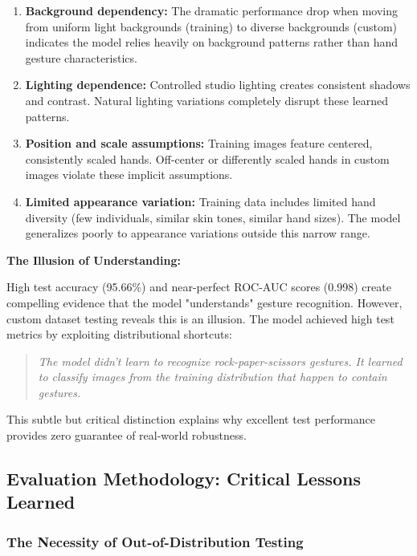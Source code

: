 \documentclass[12pt,a4paper]{article}
\begin{document}
\begin{enumerate}
    \item \textbf{Background dependency:} The dramatic performance drop when moving from uniform light backgrounds (training) to diverse backgrounds (custom) indicates the model relies heavily on background patterns rather than hand gesture characteristics.
    
    \item \textbf{Lighting dependence:} Controlled studio lighting creates consistent shadows and contrast. Natural lighting variations completely disrupt these learned patterns.
    
    \item \textbf{Position and scale assumptions:} Training images feature centered, consistently scaled hands. Off-center or differently scaled hands in custom images violate these implicit assumptions.
    
    \item \textbf{Limited appearance variation:} Training data includes limited hand diversity (few individuals, similar skin tones, similar hand sizes). The model generalizes poorly to appearance variations outside this narrow range.
\end{enumerate}

\textbf{The Illusion of Understanding:}

High test accuracy (95.66\%) and near-perfect ROC-AUC scores (0.998) create compelling evidence that the model "understands" gesture recognition. However, custom dataset testing reveals this is an illusion. The model achieved high test metrics by exploiting distributional shortcuts:

\begin{quotation}
\textit{The model didn't learn to recognize rock-paper-scissors gestures. It learned to classify images from the training distribution that happen to contain gestures.}
\end{quotation}

This subtle but critical distinction explains why excellent test performance provides zero guarantee of real-world robustness.

\subsection{Evaluation Methodology: Critical Lessons Learned}

\subsubsection{The Necessity of Out-of-Distribution Testing}
\end{document}
